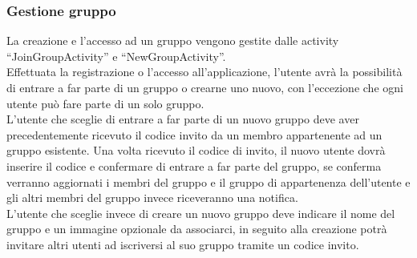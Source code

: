 \subsubsection{Gestione gruppo}
La creazione e l'accesso ad un gruppo vengono gestite dalle activity ``JoinGroupActivity'' e ``NewGroupActivity''.\\
Effettuata la registrazione o l'accesso all'applicazione, l'utente avrà la possibilità di entrare a far parte di un gruppo o crearne uno nuovo, con l'eccezione che ogni utente può fare parte di un solo gruppo.\\
L'utente che sceglie di entrare a far parte di un nuovo gruppo deve aver precedentemente ricevuto il codice invito da un membro appartenente ad un gruppo esistente. Una volta ricevuto il codice di invito, il nuovo utente dovrà inserire il codice e confermare di entrare a far parte del gruppo, se conferma verranno aggiornati i membri del gruppo e il gruppo di appartenenza dell'utente e gli altri membri del gruppo invece riceveranno una notifica.\\
L'utente che sceglie invece di creare un nuovo gruppo deve indicare il nome del gruppo e un immagine opzionale da associarci, in seguito alla creazione potrà invitare altri utenti ad iscriversi al suo gruppo tramite un codice invito.

